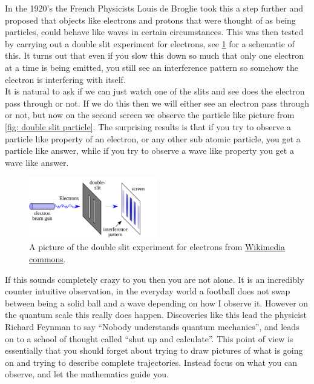 \documentclass[a4paper,12pt]{book}
\begin{document}
In the 1920's the French Physicists Louis de Broglie took this a step further and proposed that objects like electrons and protons that were thought of as being particles, could behave like waves in certain circumstances. This was then tested by carrying out a double slit experiment for electrons, see \cref{fig: double slit electrons} for a schematic of this.  It turns out that even if you slow this down so much that only one electron at a time is being emitted, you still see an interference pattern so somehow the electron is interfering with itself.\\

It is natural to ask if we can just watch one of the slits and see does the electron pass through or not. If we do this then we will either see an electron pass through or not, but now on the second screen we observe the particle like picture from \cref{fig: double slit particle}. The surprising results is that if you try to observe a particle like property of an electron, or any other sub atomic particle, you get a particle like answer, while if you try to observe a wave like property you get a wave like answer.\\

\begin{figure}[ht]
    \centering
    \includegraphics[width=0.5\textwidth]{figures/double_slit_electrons.png}
    \caption{A picture of the double slit experiment for electrons from \href{https://commons.wikimedia.org/wiki/File:Double-slit.svg}{Wikimedia commons}.}
    \label{fig: double slit electrons}
\end{figure}

If this sounds completely crazy to you then you are not alone. It is an incredibly counter intuitive observation, in the everyday world a football does not swap between being a solid ball and a wave depending on how I observe it. However on the quantum scale this really does happen. Discoveries like this lead the physicist Richard Feynman to say ``Nobody understands quantum mechanics'', and leads on to a school of thought called ``shut up and calculate''. This point of view is essentially that you should forget about trying to draw pictures of what is going on  and trying to describe complete trajectories. Instead focus on what you can observe, and let the mathematics guide you. 
\end{document}
